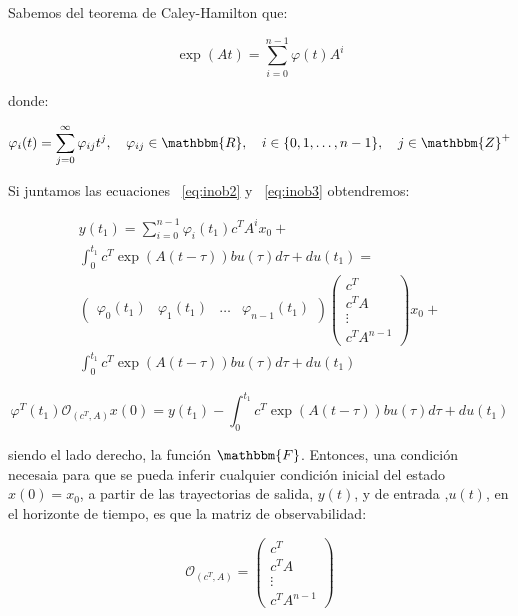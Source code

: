 		Sabemos del teorema de Caley-Hamilton que:

		\begin{equation} \label{eq:inob3}
			\exp{(At)} = \sum_{i=0}^{n-1} \varphi(t) A^i
		\end{equation}

		donde:

		\begin{equation*}
			\varphi_i(t) = \sum_{j=0}^{\infty} \varphi_{ij} t^j, \quad \varphi_{ij} \in \mathbbm{R}, \quad i \in \{ 0, 1, \dots , n-1 \}, \quad j \in \mathbbm{Z}^+
		\end{equation*}

		Si juntamos las ecuaciones ~\ref{eq:inob2} y ~\ref{eq:inob3} obtendremos:

		\begin{multline*}
			y(t_1) = \sum_{i=0}^{n-1} \varphi_i (t_1) c^T A^i x_0 + \\
			\int_0^{t_1} c^T \exp{\left(A(t - \tau)\right)} b u(\tau) d\tau +d u(t_1) = \\
			\begin{pmatrix}
				\varphi_0(t_1) & \varphi_1(t_1) & \dots & \varphi_{n-1}(t_1)
			\end{pmatrix}
			\begin{pmatrix}
				c^T \\
				c^T A \\
				\vdots \\
				c^T A^{n-1}
			\end{pmatrix} x_0 + \\
			\int_0^{t_1} c^T \exp{\left(A(t - \tau)\right)} b u(\tau) d\tau +d u(t_1)
		\end{multline*}

		\begin{equation} \label{eq:inob4}
			\varphi^T(t_1) \mathcal{O}_{(c^T, A)} x(0) = y(t_1) - \int_0^{t_1} c^T \exp{\left(A(t - \tau)\right)} b u(\tau) d\tau +d u(t_1)
		\end{equation}

		siendo el lado derecho, la función $\mathbbm{F}$. Entonces, una condición necesaia para que se pueda inferir cualquier condición inicial del estado $x(0) = x_0$, a partir de las trayectorias de salida, $y(t)$, y de entrada ,$u(t)$, en el horizonte de tiempo, es que la matriz de observabilidad:

		\begin{equation}
			\mathcal{O}_{(c^T, A)} =
			\begin{pmatrix}
				c^T \\
				c^T A \\
				\vdots \\
				c^T A^{n-1}
			\end{pmatrix}
		\end{equation}


